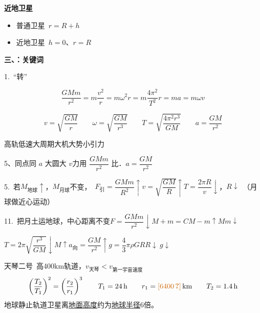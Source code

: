 \textbf{近地卫星}
\begin{itemize}
\item 普通卫星\ $r=R+h$
\item 近地卫星\ $h=0$、$r=R$
\end{itemize}

\textbf{三、：关键词}

1.\ “转”
\begin{keybox}[认为圆周]
\[ \dfrac{GMm}{r^{2}}=m\dfrac{v^{2}}{r}=m\omega^{2}r=m\dfrac{4\pi^{2}}{T^{2}}r=ma=m\omega v \]
\end{keybox}
\[ v=\sqrt{\dfrac{GM}{r}}\qquad \omega=\sqrt{\dfrac{GM}{r^{3}}}\qquad T=\sqrt{\dfrac{4\pi^{2}r^{3}}{GM}}\qquad a=\dfrac{GM}{r^{2}} \]

高轨低速大周期大机大势小引力%

5、同点同 $a$ 大圆大 $v$\quad 力用 $\dfrac{GMm}{r^2}$ 比．$a=\dfrac{GM}{r^2}$

5.\ 若$M_{\text{地球}}\uparrow$，$M_{\text{月球}}$不变，\ $F_{\text{引}}=\dfrac{GMm}{R^2}\uparrow$\quad $v=\sqrt{\dfrac{GM}{R}}\uparrow$\quad $T=\dfrac{2\pi R}{v}\downarrow$，$R\downarrow$\ （月球做近心运动） %

11.\ 把月土运地球，中心距离不变\quad $F=\dfrac{GMm}{r^2}\downarrow$\quad $M+m=C$\quad $M-m\uparrow$\quad $Mm\downarrow$ %

\hspace{4em}$T=2\pi\sqrt{\dfrac{r^3}{GM}}\downarrow$\quad $M\uparrow$\quad $a_{\text{向}}=\dfrac{GM}{r^2}\uparrow$\quad $g=\dfrac43\pi\rho GR$\quad $R\downarrow\ g\downarrow$

天琴二号\ 高400$\mathrm{km}$轨道，\underline{$v_{\text{天琴}}<v_{\text{第一宇宙速度}}$}
\[
\left(\frac{T_2}{T_1}\right)^2=\left(\frac{r_2}{r_1}\right)^3\qquad T_1=24\,\mathrm{h}\qquad r_1=\unclear{6400}\,\mathrm{km}\qquad T_2=1.4\,\mathrm{h}
\]
地球静止轨道卫星离\underline{地面高度}约为\underline{地球半径}6倍。

